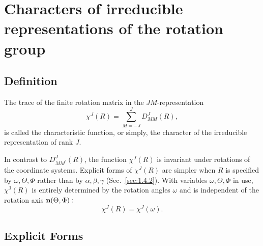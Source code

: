\section{Characters of irreducible representations of the rotation group}\label{sec:4.14}
\subsection{Definition}\label{sec:4.14.1}
The trace of the finite rotation matrix in the $JM$-representation
\begin{equation}
\chi^{J}(R)=\sum_{M=-J}^{J} D_{M M}^{J}(R), \label{eq:4:14:1}
\end{equation}
is called the characteristic function, or simply, the character of the irreducible representation of rank $J$.

In contrast to $D_{M M^{\prime}}^{J}(R)$, the function $\chi^{J}(R)$ is invariant under rotations of the coordinate systems. Explicit forms of $\chi^{J}(R)$ are simpler when $R$ is specified by $\omega, \Theta, \Phi$ rather than by $\alpha, \beta, \gamma$ (Sec.~\ref{sec:1.4.2}). With variables $\omega, \Theta, \Phi$ in use, $\chi^{\mathrm{J}}(R)$ is entirely determined by the rotation angles $\omega$ and is independent of the rotation axis $\mathbf{n}(\Theta, \Phi):$
\begin{equation}
\chi^{J}(R)=\chi^{J}(\omega). \label{eq:4:14:2}
\end{equation}
\subsection{Explicit Forms}\label{sec:4.14.2}
